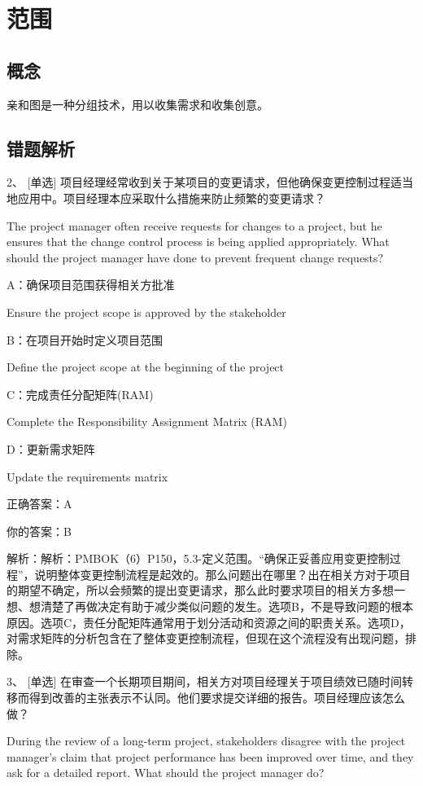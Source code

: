 
\chapter{范围}

\section{概念}

亲和图是一种分组技术，用以收集需求和收集创意。


\section{错题解析}

2、 [单选] 项目经理经常收到关于某项目的变更请求，但他确保变更控制过程适当地应用中。项目经理本应采取什么措施来防止频繁的变更请求？

The project manager often receive requests for changes to a project, but he ensures that the change control process is being applied appropriately. What should the project manager have done to prevent frequent change requests?

A：确保项目范围获得相关方批准

Ensure the project scope is approved by the stakeholder

B：在项目开始时定义项目范围

Define the project scope at the beginning of the project

C：完成责任分配矩阵(RAM)

Complete the Responsibility Assignment Matrix (RAM)

D：更新需求矩阵

Update the requirements matrix

正确答案：A

你的答案：B

解析：解析：PMBOK（6）P150，5.3-定义范围。“确保正妥善应用变更控制过程”，说明整体变更控制流程是起效的。那么问题出在哪里？出在相关方对于项目的期望不确定，所以会频繁的提出变更请求，那么此时要求项目的相关方多想一想、想清楚了再做决定有助于减少类似问题的发生。选项B，不是导致问题的根本原因。选项C，责任分配矩阵通常用于划分活动和资源之间的职责关系。选项D，对需求矩阵的分析包含在了整体变更控制流程，但现在这个流程没有出现问题，排除。


3、 [单选] 在审查一个长期项目期间，相关方对项目经理关于项目绩效已随时间转移而得到改善的主张表示不认同。他们要求提交详细的报告。项目经理应该怎么做？

During the review of a long-term project, stakeholders disagree with the project manager’s claim that project performance has been improved over time, and they ask for a detailed report. What should the project manager do?

